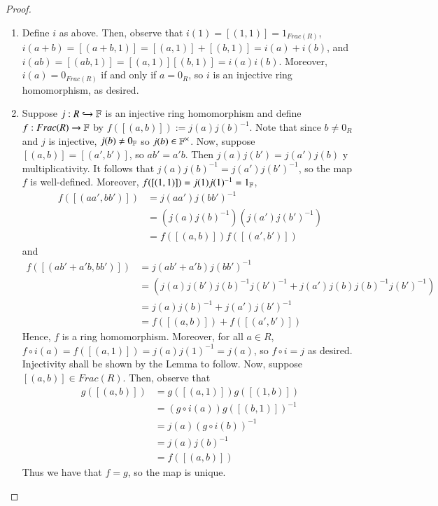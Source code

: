 \begin{proof}
    \begin{enumerate}
        \item Define $i$ as above. Then, observe that $i(1) = [(1,1)] = 1_{Frac(R)}$, $i(a+b) = [(a+b,1)] = [(a,1)] + [(b,1)] = i(a) + i(b)$, and $i(ab) = [(ab,1)] = [(a,1)][(b,1)] = i(a)i(b)$. Moreover, $i(a) = 0_{Frac(R)}$ if and only if $a = 0_R$, so $i$ is an injective ring homomorphism, as desired.
        \item Suppose $j:R\hookrightarrow \mathbb F$ is an injective ring homomorphism and define $f:Frac(R) \rightarrow \mathbb F$ by $f([(a,b)]) := j(a)j(b)^{-1}$. Note that since $b \neq 0_R$ and $j$ is injective, $j(b) \neq 0_{\mathbb F}$ so $j(b) \in \mathbb F^{\times}$. Now, suppose $[(a,b)] = [(a',b')]$, so $ab' = a'b$. Then $j(a)j(b') = j(a')j(b)$ y multiplicativity. It follows that $j(a)j(b)^{-1} = j(a')j(b')^{-1}$, so the map $f$ is well-defined. Moreover, $f([(1,1)]) = j(1)j(1)^{-1} = 1_{\mathbb F}$, \begin{align*}
            f([(aa',bb')]) &= j(aa')j(bb')^{-1} \\
            &= (j(a)j(b)^{-1})(j(a')j(b')^{-1}) \\
            &= f([(a,b)])f([(a',b')])
        \end{align*}
        and \begin{align*}
            f([(ab' + a'b,bb')]) &= j(ab'+a'b)j(bb')^{-1} \\
            &= (j(a)j(b')j(b)^{-1}j(b')^{-1}+j(a')j(b)j(b)^{-1}j(b')^{-1}) \\
            &= j(a)j(b)^{-1} + j(a')j(b')^{-1} \\
            &= f([(a,b)])+f([(a',b')])
        \end{align*}
        Hence, $f$ is a ring homomorphism. Moreover, for all $a \in R$, $f\circ i(a) = f([(a,1)]) = j(a)j(1)^{-1} = j(a)$, so $f\circ i = j$ as desired. Injectivity shall be shown by the Lemma to follow. Now, suppose $[(a,b)] \in Frac(R)$. Then, observe that \begin{align*}
            g([(a,b)]) &= g([(a,1)])g([(1,b)]) \tag{by multiplicativity} \\
            &= (g\circ i(a))g([(b,1)])^{-1} \tag{by multiplicativity and $b \neq 0$} \\
            &= j(a)(g\circ i(b))^{-1} \\
            &= j(a)j(b)^{-1} \\
            &= f([(a,b)]) \tag{by definition}
        \end{align*}
        Thus we have that $f = g$, so the map is unique.
    \end{enumerate}
\end{proof}

